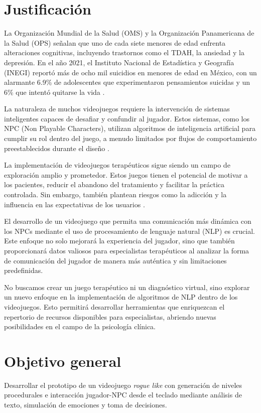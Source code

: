\documentclass[12pt,twoside]{article}
\begin{document}
	\clearpage
	\section{Justificación}
	
	La Organización Mundial de la Salud (OMS) y la Organización Panamericana de la Salud (OPS) señalan que uno de cada siete menores de edad enfrenta alteraciones cognitivas, incluyendo trastornos como el TDAH, la ansiedad y la depresión. En el año 2021, el Instituto Nacional de Estadística y Geografía (INEGI) reportó más de ocho mil suicidios en menores de edad en México, con un alarmante 6.9\% de adolescentes que experimentaron pensamientos suicidas y un 6\% que intentó quitarse la vida \cite{info: justificacion1}.
 	
 	La naturaleza de muchos videojuegos requiere la intervención de sistemas inteligentes capaces de desafiar y confundir al jugador. Estos sistemas, como los NPC (Non Playable Characters), utilizan algoritmos de inteligencia artificial para cumplir su rol dentro del juego, a menudo limitados por flujos de comportamiento preestablecidos durante el diseño \cite{info: justificacion2}. 
 	
 	La implementación de videojuegos terapéuticos sigue siendo un campo de exploración amplio y prometedor. Estos juegos tienen el potencial de motivar a los pacientes, reducir el abandono del tratamiento y facilitar la práctica controlada. Sin embargo, también plantean riesgos como la adicción y la influencia en las expectativas de los usuarios \cite{info: justificacion3}.
 	
	 El desarrollo de un videojuego que permita una comunicación más dinámica con los NPCs mediante el uso de procesamiento de lenguaje natural (NLP) es crucial. Este enfoque no solo mejorará la experiencia del jugador, sino que también proporcionará datos valiosos para especialistas terapéuticos al analizar la forma de comunicación del jugador de manera más auténtica y sin limitaciones predefinidas.
	 
	 No buscamos crear un juego terapéutico ni un diagnóstico virtual, sino explorar un nuevo enfoque en la implementación de algoritmos de NLP dentro de los videojuegos. Esto permitirá desarrollar herramientas que enriquezcan el repertorio de recursos disponibles para especialistas, abriendo nuevas posibilidades en el campo de la psicología clínica.
 	
	\clearpage
	\section{Objetivo general}
	Desarrollar el prototipo de un videojuego \textit{rogue like} con generación de niveles procedurales e interacción jugador-NPC desde el teclado mediante análisis de texto, simulación de emociones y toma de decisiones.
	
\end{document}
